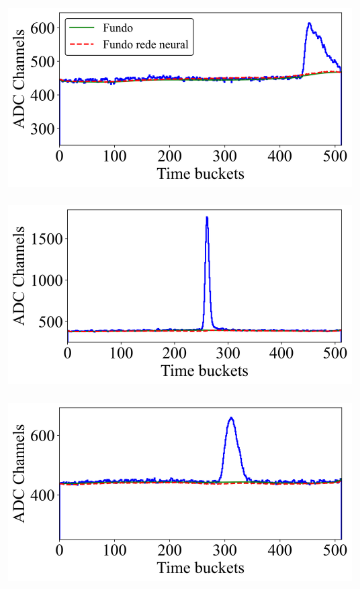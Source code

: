 \documentclass[a4paper,12pt,oneside]{book}
\begin{document}
\begin{figure}[H]
\centering
    \begin{subfigure}[b]{0.47\textwidth}
        \centering
        \includegraphics[scale=0.43]{figs/stb_1.png}
        \caption{}
        \label{subfig:stb_ex1}
    \end{subfigure}%
    \hfill
    \begin{subfigure}[b]{0.46\textwidth}
        \centering
        \includegraphics[scale=0.43]{figs/stb_2.png}
        \caption{}
        \label{subfig:stb_ex2}
    \end{subfigure}
    \begin{subfigure}[b]{0.47\textwidth}
        \centering
        \includegraphics[scale=0.43]{figs/stb_3.png}

\end{subfigure}
\end{figure}
\end{document}

